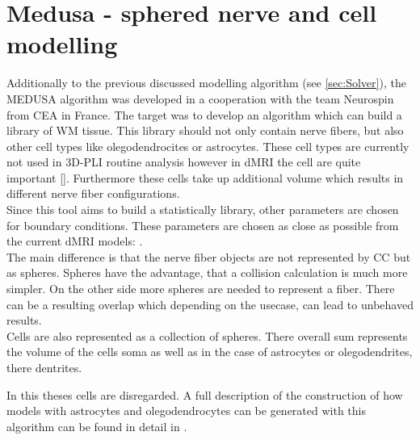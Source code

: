 \section{Medusa - sphered nerve and cell modelling}
\label{sec:medusa}
%
%
Additionally to the previous discussed modelling algorithm (see \cref{sec:Solver}), the \ac{MEDUSA} algorithm \cite{Ginsburger2019} was developed in a cooperation with the team Neurospin from \ac{CEA} in France.
The target was to develop an algorithm which can build a library of \ac{WM} tissue.
This library should not only contain nerve fibers, but also other cell types like olegodendrocites or astrocytes.
These cell types are currently not used in \ac{3D-PLI} routine analysis however in \ac{dMRI} the cell are quite important [\dummy{}].
Furthermore these cells take up additional volume which results in different nerve fiber configurations.
\\
%
Since this tool aims to build a statistically library, other parameters are chosen for boundary conditions.
These parameters are chosen as close as possible from the current \ac{dMRI} models:
\dummy{}.
\\
%
The main difference is that the nerve fiber objects are not represented by \ac{CC} but as spheres.
Spheres have the advantage, that a collision calculation is much more simpler.
On the other side more spheres are needed to represent a fiber.
There can be a resulting overlap which depending on the usecase, can lead to unbehaved results.
\\
%
Cells are also represented as a collection of spheres.
There overall sum represents the volume of the cells soma as well as in the case of astrocytes or olegodendrites, there dentrites.
\par
%
In this theses cells are disregarded.
A full description of the construction of how models with astrocytes and olegodendrocytes can be generated with this algorithm can be found in detail in  \cite{Ginsburger2019}.
%
